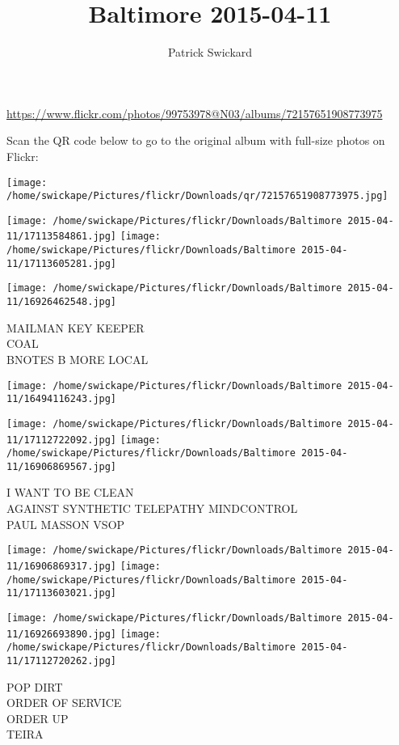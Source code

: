\documentclass[10pt,letterpaper]{article}
\title{Baltimore 2015-04-11}
\author{Patrick Swickard}
\date{}
\begin{document}
\maketitle

\url{https://www.flickr.com/photos/99753978@N03/albums/72157651908773975}

Scan the QR code below to go to the original album with full-size photos on Flickr:

\texttt{[image: /home/swickape/Pictures/flickr/Downloads/qr/72157651908773975.jpg]}
\pagebreak

\texttt{[image: /home/swickape/Pictures/flickr/Downloads/Baltimore 2015-04-11/17113584861.jpg]}
\texttt{[image: /home/swickape/Pictures/flickr/Downloads/Baltimore 2015-04-11/17113605281.jpg]}

\texttt{[image: /home/swickape/Pictures/flickr/Downloads/Baltimore 2015-04-11/16926462548.jpg]}

MAILMAN KEY KEEPER\\
COAL\\
BNOTES B MORE LOCAL
\pagebreak

\texttt{[image: /home/swickape/Pictures/flickr/Downloads/Baltimore 2015-04-11/16494116243.jpg]}

\vspace{0.25in}
\texttt{[image: /home/swickape/Pictures/flickr/Downloads/Baltimore 2015-04-11/17112722092.jpg]}
\texttt{[image: /home/swickape/Pictures/flickr/Downloads/Baltimore 2015-04-11/16906869567.jpg]}

I WANT TO BE CLEAN\\
AGAINST SYNTHETIC TELEPATHY MINDCONTROL\\
PAUL MASSON VSOP
\pagebreak

\texttt{[image: /home/swickape/Pictures/flickr/Downloads/Baltimore 2015-04-11/16906869317.jpg]}
\texttt{[image: /home/swickape/Pictures/flickr/Downloads/Baltimore 2015-04-11/17113603021.jpg]}

\texttt{[image: /home/swickape/Pictures/flickr/Downloads/Baltimore 2015-04-11/16926693890.jpg]}
\texttt{[image: /home/swickape/Pictures/flickr/Downloads/Baltimore 2015-04-11/17112720262.jpg]}

POP DIRT\\
ORDER OF SERVICE\\
ORDER UP\\
TEIRA
\pagebreak
\end{document}
